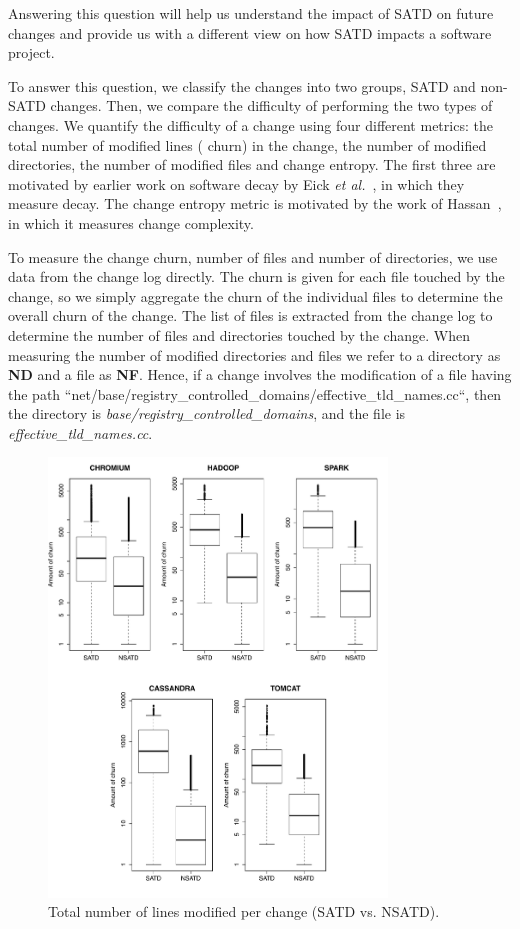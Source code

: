 Answering this question will help us understand the impact of SATD on future changes and provide us with a different view on how SATD impacts a software project.


  To answer this question, we classify the changes into two groups, \ie{} SATD and non-SATD changes. Then, we compare the difficulty of performing the two types of changes. We quantify the difficulty of a change using four different metrics: the total number of modified lines (\ie{} churn) in the change, the number of modified directories, the number of modified files and change entropy. The first three are motivated by earlier work on software decay by Eick \emph{et al.}~\cite{eick2001decay}, in which they measure decay. The change entropy metric is motivated by the work of Hassan~\cite{hassan2009predicting}, in which it measures change complexity.



To measure the change churn, number of files and number of directories, we use data from the change log directly. The churn is given for each file touched by the change, so we simply aggregate the churn of the individual files to determine the overall churn of the change. The list of files is extracted from the change log to determine the number of files and directories touched by the change. When measuring the number of modified  directories and files we refer to a directory as \textbf{ND} and  a file as \textbf{NF}. Hence, if a change involves the modification of a file having the path ``net/base/registry\_controlled\_domains/effective\_tld\_names.cc``, then the directory is \textit{base/registry\_controlled\_domains}, and the file is \textit{effective\_tld\_names.cc}.



\begin{figure}[!tb]
	\centering
	\includegraphics[width=90mm]{figures/chapter3/churn_for_all_projects}
	\caption{Total number of lines modified per change (SATD vs. NSATD).}
	\label{figure:tlcpc}
\end{figure}




